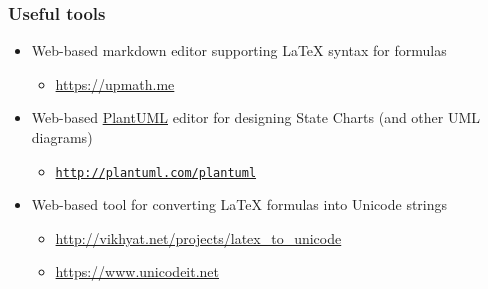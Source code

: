 \documentclass[presentation]{beamer}\mode<presentation>{\usetheme{AMSCesenaPurpleAndGold}}
\begin{document}
\begin{frame}\label{useful-tools}
\frametitle{Useful tools}
    
    \begin{itemize}
        \item Web-based markdown editor supporting \LaTeX{} syntax for formulas
        \begin{itemize}
            \item \url{https://upmath.me}
        \end{itemize}
        
        \vfill
        
        \item Web-based \href{http://plantuml.com/}{PlantUML} editor for designing State Charts (and other UML diagrams)
        \begin{itemize}
            \item \href{http://www.plantuml.com/plantuml/uml/XOz1JW8n58RtFSLRWWbaW1qXG4HCt60Yi48MpVI93Prsqhwget4XmSG5rt2XPp7n3dCI2uYEoIGkclxfz_wlUNr7t99F57DBgLDkUG8dUCMzebEZQIpl4PfH0Ow94-uGPGf14bSoTkNj4KyG1iPRYPPTIu60IKeP27InbIb9ercXwRPgU600npnUBgpnMWoCChRJ6MeXzQBR1QFa3PPDJ3NUfI6X25CPAcLksIDZiwCvr6fTS17RwKDeW_5KeNprLAr_frMrBdM5FjQ_TmJvosiupyn5UqEZKBpKi_Ff9AGvEtW3_jUsUTksyyqxSuszjDc6ptMmdOt6mul9_EUzLR2LVDQ4lnkteTVh7M2h5FPH2v-eBm00}{\texttt{http://plantuml.com/plantuml}}
        \end{itemize}
        
        \vfill
        
        \item Web-based tool for converting \LaTeX{} formulas into Unicode strings
        \begin{itemize}
            \item \url{http://vikhyat.net/projects/latex_to_unicode}
            \item \url{https://www.unicodeit.net}
        \end{itemize}
    \end{itemize}
    
\end{frame}

\maketitle

\end{document}
